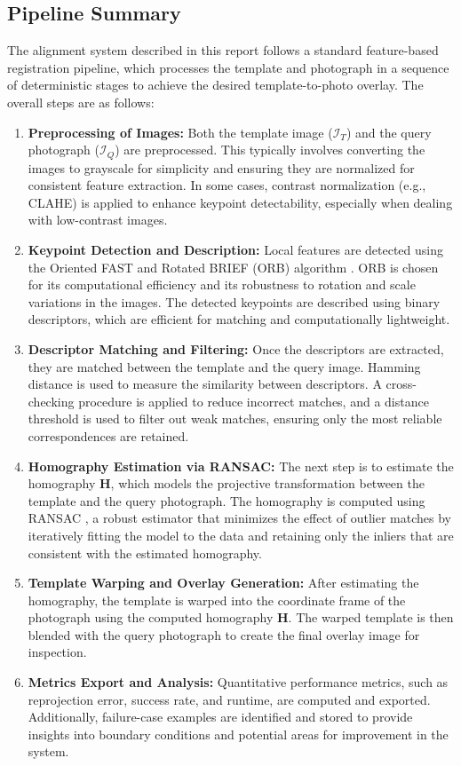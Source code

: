 
\subsection{Pipeline Summary}
The alignment system described in this report follows a standard feature-based registration pipeline, which processes the template and photograph in a sequence of deterministic stages to achieve the desired template-to-photo overlay. The overall steps are as follows:

\begin{enumerate}
  \item \textbf{Preprocessing of Images:} Both the template image ($\mathcal{I}_T$) and the query photograph ($\mathcal{I}_Q$) are preprocessed. This typically involves converting the images to grayscale for simplicity and ensuring they are normalized for consistent feature extraction. In some cases, contrast normalization (e.g., CLAHE) is applied to enhance keypoint detectability, especially when dealing with low-contrast images.
  \item \textbf{Keypoint Detection and Description:} Local features are detected using the Oriented FAST and Rotated BRIEF (ORB) algorithm \citep{Rublee2011ORB}. ORB is chosen for its computational efficiency and its robustness to rotation and scale variations in the images. The detected keypoints are described using binary descriptors, which are efficient for matching and computationally lightweight.
  \item \textbf{Descriptor Matching and Filtering:} Once the descriptors are extracted, they are matched between the template and the query image. Hamming distance is used to measure the similarity between descriptors. A cross-checking procedure is applied to reduce incorrect matches, and a distance threshold is used to filter out weak matches, ensuring only the most reliable correspondences are retained.
  \item \textbf{Homography Estimation via RANSAC:} The next step is to estimate the homography $\mathbf{H}$, which models the projective transformation between the template and the query photograph. The homography is computed using RANSAC \citep{FischlerBolles1981}, a robust estimator that minimizes the effect of outlier matches by iteratively fitting the model to the data and retaining only the inliers that are consistent with the estimated homography.
  \item \textbf{Template Warping and Overlay Generation:} After estimating the homography, the template is warped into the coordinate frame of the photograph using the computed homography $\mathbf{H}$. The warped template is then blended with the query photograph to create the final overlay image for inspection.
  \item \textbf{Metrics Export and Analysis:} Quantitative performance metrics, such as reprojection error, success rate, and runtime, are computed and exported. Additionally, failure-case examples are identified and stored to provide insights into boundary conditions and potential areas for improvement in the system.
\end{enumerate}

